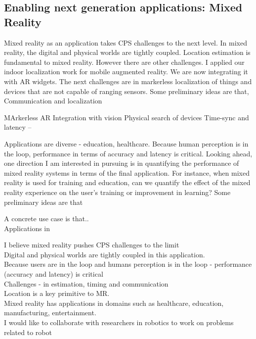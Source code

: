 \documentclass[10pt]{article}
\begin{document}
\subsection{Enabling next generation applications: Mixed Reality}
Mixed reality as an application takes CPS challenges to the next level. In mixed reality, the digital and physical worlds are tightly coupled.  Location estimation is fundamental to mixed reality. 
However there are other challenges. I applied our indoor localization work for mobile augmented reality. We are now integrating it with AR widgets. The next challenges are in markerless localization of things and devices that are not capable of ranging sensors. Some preliminary ideas are that,\\
Communication and localization

MArkerless AR 
Integration with vision
Physical search of devices
Time-sync and latency --

Applications are diverse - education, healthcare. Because human perception is in the loop, performance in terms of accuracy and latency is critical. Looking ahead, one direction I am interested in pursuing is in quantifying the performance of mixed reality systems in terms of the final application. For instance, when mixed reality is used for training and education, can we quantify the effect of the mixed reality experience on the user's training or improvement in learning? Some preliminary ideas are that 

A concrete use case is that..\\
Applications in 

I believe mixed reality pushes CPS challenges to the limit\\
Digital and physical worlds are tightly coupled in this application.\\
Because users are in the loop and humans perception is in the loop - performance (accuracy and latency) is critical \\
Challenges -  in estimation, timing and communication\\
Location is a key primitive to MR.\\
Mixed reality has applications in domains such as healthcare, education, manufacturing, entertainment. \\
I would like to collaborate with researchers in robotics to work on problems related to robot
\end{document}
